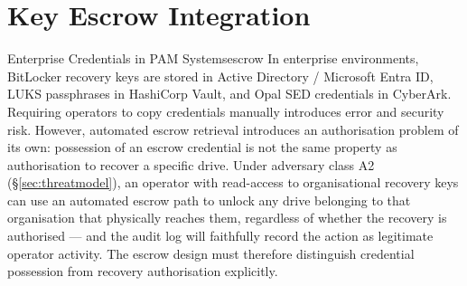 \documentclass[11pt,a4paper]{report}
\begin{document}
\section{Key Escrow Integration}
\label{sec:escrow}

\begin{edgecase}{Enterprise Credentials in PAM Systems}{escrow}
In enterprise environments, BitLocker recovery keys are stored in Active Directory / Microsoft Entra ID, LUKS passphrases in HashiCorp Vault, and Opal SED credentials in CyberArk. Requiring operators to copy credentials manually introduces error and security risk. However, automated escrow retrieval introduces an authorisation problem of its own: possession of an escrow credential is not the same property as authorisation to recover a specific drive. Under adversary class A2 (\S\ref{sec:threatmodel}), an operator with read-access to organisational recovery keys can use an automated escrow path to unlock any drive belonging to that organisation that physically reaches them, regardless of whether the recovery is authorised --- and the audit log will faithfully record the action as legitimate operator activity. The escrow design must therefore distinguish credential possession from recovery authorisation explicitly.
\end{edgecase}
\end{document}
